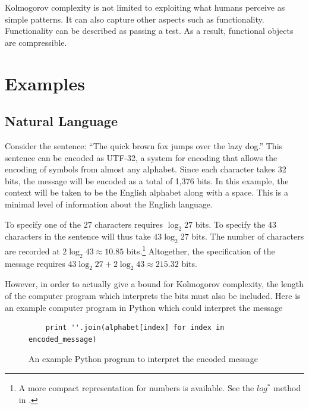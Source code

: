 Kolmogorov complexity is not limited to exploiting what humans perceive as simple patterns.
It can also capture other aspects such as functionality.
Functionality can be described as passing a test.
As a result, functional objects are compressible.

\section{Examples}
\subsection{Natural Language}
Consider the sentence: ``The quick brown fox jumps over the lazy dog.''
This sentence can be encoded as UTF-32, a system for encoding that allows the encoding of symbols from almost any alphabet.
Since each character takes 32 bits, the message will be encoded as a total of 1,376 bits.
In this example, the context will be taken to be the English alphabet along with a space.
This is a minimal level of information about the English language.

To specify one of the 27 characters requires $\log_2 27$ bits. 
To specify the 43 characters in the sentence will thus take $43 \log_2 27$ bits.
The number of characters are recorded at $2 \log_2 43 \approx 10.85$ bits.\footnote{A more compact representation for numbers is available. See the $log^*$ method in \citet{Cover2006}.}
Altogether, the specification of the message requires $43 \log_2 27 + 2 \log_2 43 \approx 215.32$ bits. 


However, in order to actually give a bound for Kolmogorov complexity, the length of the computer program which interprets the bits must also be included.
Here is an example computer program in Python which could interpret the message
\begin{figure}[H]
\begin{mdframed}
\begin{verbatim}
    print ''.join(alphabet[index] for index in encoded_message)
\end{verbatim}
\end{mdframed}
\caption{An example Python program to interpret the encoded message}
\end{figure}

